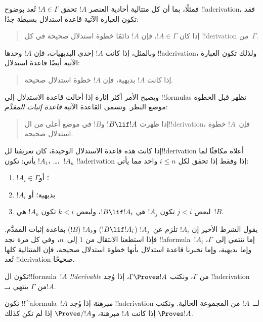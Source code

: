 \documentclass[../../../include/open-logic-section]{subfiles}
\begin{document}
فمثلًا، بما أن كل متتالية أحادية العنصر $!A$ تحقق $!A \in \Gamma$ تُعد
بوضوح !!a{derivation}، فقد تكون العبارة الآتية قاعدة استدلال بسيطة جدًا:
\begin{quote}
  إذا كان $!A \in \Gamma$، فإن $!A$ دائمًا خطوة استدلال صحيحة في كل
  !!{derivation} من~$\Gamma$.
\end{quote}
وبالمثل، إذا كانت $!A$ إحدى البديهيات، فإن $!A$ وحدها !!a{derivation}،
ولذلك تكون العبارة الآتية أيضًا قاعدة استدلال:
\begin{quote}
  إذا كانت $!A$ بديهية، فإن $!A$ خطوة استدلال صحيحة.
\end{quote}
ويصبح الأمر أكثر إثارة إذا أحالت قاعدة الاستدلال إلى !!{formula}s تظهر
قبل الخطوة موضع النظر. وتسمى القاعدة الآتية \emph{قاعدة إثبات المقدَّم}:
\begin{quote}
  إذا ظهرت $!B \lif !A$ و$!B$ في موضع أعلى من ال!!{derivation}،
  فإن~$!A$ خطوة استدلال صحيحة.
\end{quote}
إذا كانت هذه قاعدة الاستدلال الوحيدة، كان تعريفنا لل!!{derivation} أعلاه
مكافئًا لما يأتي: تكون $!A_1$، \dots،~$!A_n$ !!a{derivation} إذا وفقط
إذا تحقق لكل $i \le n$ واحد مما يأتي:
\begin{enumerate}
\item $!A_i \in \Gamma$؛ أو
\item $!A_i$ بديهية؛ أو
\item لبعض $j < i$ تكون $!A_j$ هي $!B \lif !A_i$، ولبعض $k < i$ تكون
  $!A_k$ هي~$!B$.
\end{enumerate}
يقول الشرط الأخير إن $!A_i$ تلزم عن~$!A_j$ ($!B \lif !A_i$) و$!A_k$
($!B$) بقاعدة إثبات المقدَّم. فإذا استطعنا الانتقال من $1$ إلى~$n$،
وفي كل مرة نجد !!a{formula}~$!A_i$ إما تنتمي إلى~$\Gamma$، وإما بديهية،
وإما تخبرنا قاعدة استدلال بأنها خطوة استدلال صحيحة، فإن المتتالية كلها تُعد
!!{derivation} صحيحًا.

\begin{defn}[!!^{derivability}]
تكون ال!!{formula}~$!A$ \emph{!!{derivable}} من $\Gamma$، ونكتب
$\Gamma \Proves !A$، إذا وُجد !!a{derivation} من $\Gamma$ ينتهي
بــ$!A$.
\end{defn}

\begin{defn}[المبرهنات]
تكون !!^a{formula}~$!A$ \emph{مبرهنة} إذا وُجد !!a{derivation}
لــ~$!A$ من المجموعة الخالية. ونكتب $\Proves !A$ إذا كانت $!A$ مبرهنة،
و$\Proves/ !A$ إذا لم تكن كذلك.
\end{defn}
\end{document}
